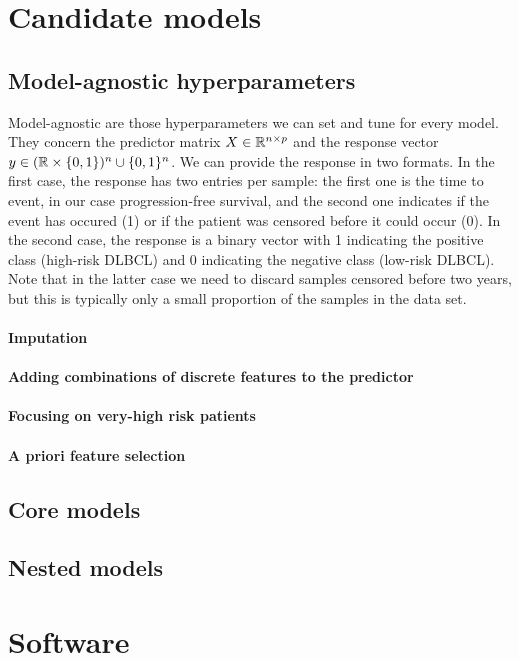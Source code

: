 \section{Candidate models}\label{sec:candidate-models}

\subsection{Model-agnostic hyperparameters}\label{subsec:model-agnostic}

Model-agnostic are those hyperparameters we can set and tune for every model. They 
concern the predictor matrix $X \in \mathbb{R}^{n \times p}$ and the response vector $y \in 
(\mathbb{R} \times \{ 0, 1 \})^n \cup \{ 0, 1 \}^n$. We can provide the response in two formats. In the 
first case, the response has two entries per sample: the first one is the time to event, in our 
case progression-free survival, and the second one indicates if the event has occured (1) or 
if the patient was censored before it could occur (0). In the second case, the response is a binary 
vector with 1 indicating the positive class (high-risk DLBCL)
and 0 indicating the negative class (low-risk DLBCL). Note that in the latter case we need 
to discard samples censored before two years, but this is typically only a small proportion of the 
samples in the data set.

\paragraph{Imputation}

\paragraph{Adding combinations of discrete features to the predictor}

\paragraph{Focusing on very-high risk patients}

\paragraph{A priori feature selection}

\subsection{Core models}\label{subsec:core-models}

\subsection{Nested models}\label{subsec:nested-models}

\section{Software}